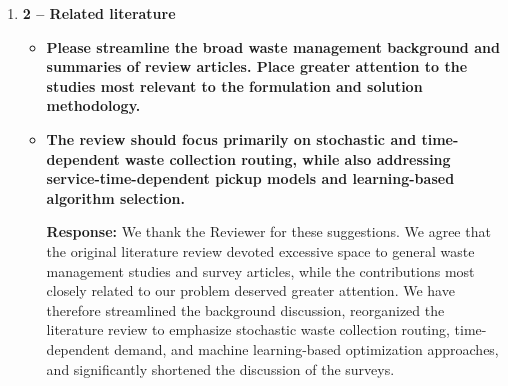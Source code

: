 \documentclass[11pt]{article}
\begin{document}
\begin{enumerate}
\begin{itemize}
\item \textbf{The introduction explains that ML selects a policy based on instance features. Please
position this contribution against existing learning-based algorithm-selection research,
particularly Asín-Achá et al. (2024), “Selecting fast algorithms for the capacitated vehicle
routing problem with machine learning techniques,” Networks, 84, 465–480. The manuscript should explain what its candidate policies and integration with stochastic optimisation add to established portfolio-selection approaches.}

\noindent\textbf{Response:}  We agree that selecting an algorithm from a portfolio according to instance characteristics is an established approach and should not be presented as a methodological novelty in itself. As pointed by the Reviewer, Asín-Achá et al. (2024) exploit ML to select a solution algorithm to solve a CVRP instance, based on its features. The specific contribution of our framework lies in its application to the selection of deterministic policies to derive a first stage solution in a two-stage stochastic programming with recourse. Rather than selecting among alternative algorithms for solving the same deterministic formulation, our candidate policies employ different approximations of stochastic demand and vehicle capacity, potentially producing different routing and scheduling decisions. The learning model predicts which policy is expected to perform best for a given instance in terms of the objective value evaluated under uncertainty. We have revised the Introduction to acknowledge previous learning-based algorithm-selection research and to clarify the specific role of policy selection in our stochastic optimization setting.
\end{itemize}


\item \textbf{2 -- Related literature}
\begin{itemize}
\item \textbf{Please streamline the broad waste management background and summaries of review
articles. Place greater attention to the studies most relevant to the formulation and
solution methodology.}
\item \textbf{The review should focus primarily on stochastic and time-dependent waste collection
routing, while also addressing service-time-dependent pickup models and learning-based
algorithm selection.}


\noindent\textbf{Response:} We thank the Reviewer for these suggestions. We agree that the original literature review devoted excessive space to general waste management studies and survey articles, while the contributions most closely related to our problem deserved greater attention. We have therefore streamlined the background discussion, reorganized the literature review to emphasize stochastic waste collection routing, time-dependent demand, and machine learning-based optimization approaches, and significantly shortened the discussion of the surveys.



\end{itemize}
\end{enumerate}
\end{document}
